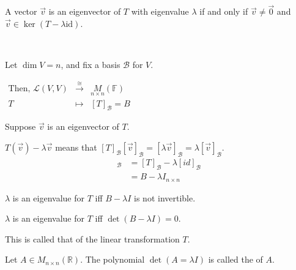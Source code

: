 \documentclass[11pt,fleqn]{book} %
\begin{document}
\setcounter{chapter}{4}
\setcounter{dummy}{4}
\begin{proposition}
    A vector $\overrightarrow{v}$ is an eigenvector of $T$ with eigenvalue $\lambda$ if and only if $\overrightarrow{v} \neq \overrightarrow{0}$ and $\overrightarrow{v} \in \ker(T - \lambda \mathrm{id})$.
\end{proposition}
\setcounter{chapter}{3}


\begin{example}
{~~~}

    Let $\dim V = n$, and fix a basis $\mathcal{B}$ for $V$. 

    $\begin{matrix} \text{Then, } \mathcal{L}(V, V) &\overset{\cong}{\to} &\underset{n \times n}M(\mathbb{F}) \\ T &\mapsto &[T]_\mathcal{B} = B \end{matrix}$

    Suppose $\overrightarrow{v}$ is an eigenvector of $T$.

    $T(\overrightarrow{v}) - \lambda \overrightarrow{v}$ means that $[T]_\mathcal{B}[\overrightarrow{v}]_\mathcal{B} = [\lambda\overrightarrow{v}]_\mathcal{B} = \lambda [\overrightarrow{v}]_\mathcal{B}$.
    \begin{align*}
        [T - \lambda ~ id]_\mathcal{B}
        &= [T]_\mathcal{B} - \lambda[id]_\mathcal{B}
        \\
        &={B - \lambda I}_{n \times n}
    \end{align*}

    $\lambda$ is an eigenvalue for $T$ iff $B - \lambda I$ is not invertible.

    $\lambda$ is an eigenvalue for $T$ iff $\det (B - \lambda I) = 0$.

    This is called that  of the linear transformation $T$.
\end{example}

\setcounter{chapter}{4}
\setcounter{definitionT}{10}
\begin{definition}
    Let $A \in M_{n \times n}(\mathbb{R})$. The polynomial $\det(A = \lambda I)$ is called the  of $A$.
\end{definition}
\setcounter{chapter}{3}
\end{document}
